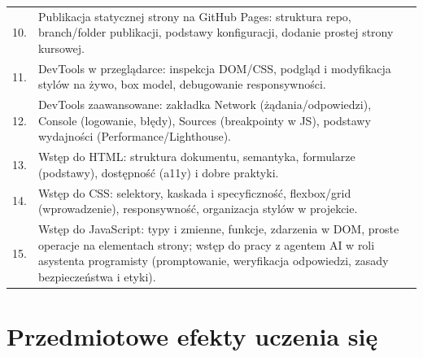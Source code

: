 \documentclass[12pt, a4paper]{article}
\begin{document}
{\begin{longtable}{m{1.5cm}m{14.5cm}}
  \rowcolor{tableRowAlt} 10. &  Publikacja statycznej strony na GitHub Pages: struktura repo, branch/folder publikacji, podstawy konfiguracji, dodanie prostej strony kursowej. \\
  \rowcolor{tableRowLight} 11. &  DevTools w przeglądarce: inspekcja DOM/CSS, podgląd i modyfikacja stylów na żywo, box model, debugowanie responsywności. \\
  \rowcolor{tableRowAlt} 12. &  DevTools zaawansowane: zakładka Network (żądania/odpowiedzi), Console (logowanie, błędy), Sources (breakpointy w JS), podstawy wydajności (Performance/Lighthouse). \\
  \rowcolor{tableRowLight} 13. &  Wstęp do HTML: struktura dokumentu, semantyka, formularze (podstawy), dostępność (a11y) i dobre praktyki. \\
  \rowcolor{tableRowAlt} 14. &  Wstęp do CSS: selektory, kaskada i specyficzność, flexbox/grid (wprowadzenie), responsywność, organizacja stylów w projekcie. \\
  \rowcolor{tableRowLight} 15. &  Wstęp do JavaScript: typy i zmienne, funkcje, zdarzenia w DOM, proste operacje na elementach strony; wstęp do pracy z agentem AI w roli asystenta programisty (promptowanie, weryfikacja odpowiedzi, zasady bezpieczeństwa i etyki). \\
\bottomrule
\end{longtable}}

\section{Przedmiotowe efekty uczenia się}
\end{document}
